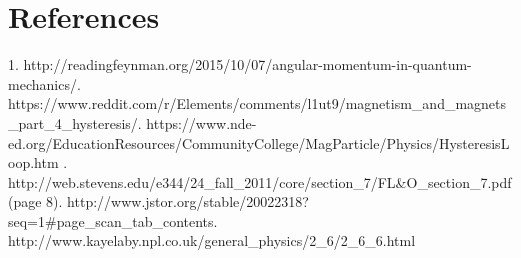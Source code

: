\documentclass[a4paper]{article}\usepackage[english]{babel}
\begin{document}
\section{References}

1.	http://readingfeynman.org/2015/10/07/angular-momentum-in-quantum-\newline mechanics/.	https://www.reddit.com/r/Elements/comments/l1ut9/magnetism\_and\_\newline magnets\_part\_4\_hysteresis/.	https://www.nde-ed.org/EducationResources/CommunityCollege/\newline MagParticle/Physics/HysteresisLoop.htm .	http://web.stevens.edu/e344/24\_fall\_2011/core/section\_7/FL\&O\_section\_7.\newline pdf (page 8).	http://www.jstor.org/stable/20022318?seq=1\#page\_scan\_tab\_contents.	http://www.kayelaby.npl.co.uk/general\_physics/2\_6/2\_6\_6.html
\end{document}
